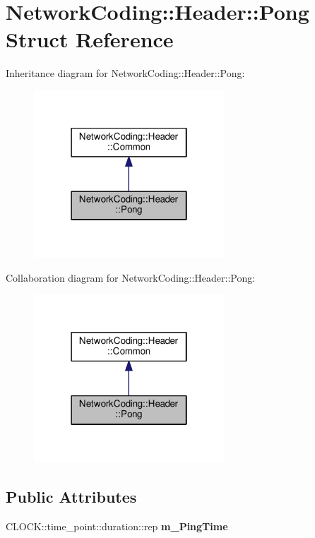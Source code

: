 \hypertarget{struct_network_coding_1_1_header_1_1_pong}{}\section{Network\+Coding\+:\+:Header\+:\+:Pong Struct Reference}
\label{struct_network_coding_1_1_header_1_1_pong}


Inheritance diagram for Network\+Coding\+:\+:Header\+:\+:Pong\+:\nopagebreak
\begin{figure}[H]
\begin{center}
\leavevmode
\includegraphics[width=202pt]{struct_network_coding_1_1_header_1_1_pong__inherit__graph}
\end{center}
\end{figure}


Collaboration diagram for Network\+Coding\+:\+:Header\+:\+:Pong\+:\nopagebreak
\begin{figure}[H]
\begin{center}
\leavevmode
\includegraphics[width=202pt]{struct_network_coding_1_1_header_1_1_pong__coll__graph}
\end{center}
\end{figure}
\subsection*{Public Attributes}
\begin{DoxyCompactItemize}
\item 
C\+L\+O\+C\+K\+::time\+\_\+point\+::duration\+::rep {\bfseries m\+\_\+\+Ping\+Time}\hypertarget{struct_network_coding_1_1_header_1_1_pong_adf16054eedcffdd9c09bec8449493b67}{}\label{struct_network_coding_1_1_header_1_1_pong_adf16054eedcffdd9c09bec8449493b67}

\end{DoxyCompactItemize}
